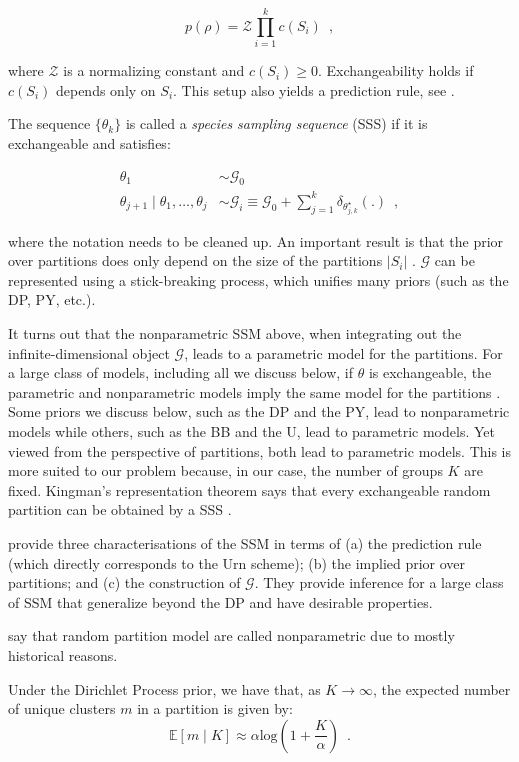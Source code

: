 \documentclass[]{article}
\begin{document}
\begin{equation}
    p(\rho) = \mathcal{Z} \prod_{i=1}^k c(S_i) \enspace ,
\end{equation}

where $\mathcal{Z}$ is a normalizing constant and $c(S_i) \geq 0$. Exchangeability holds if $c(S_i)$ depends only on $S_i$. This setup also yields a prediction rule, see \textcite[][Eq (7)]{quintana2006predictive}.

The sequence $\{\theta_k\}$ is called a \textit{species sampling sequence} (SSS) if it is exchangeable and satisfies:

\begin{align}
    \theta_1 &\sim \mathcal{G}_0 \\
    \theta_{j + 1} \mid \theta_1, \ldots, \theta_j  &\sim \mathcal{G}_i \equiv \mathcal{G}_0 + \sum_{j=1}^k \delta_{\theta^{\star}_{j, k}}(.) \enspace ,
\end{align}

where the notation needs to be cleaned up. An important result is that the prior over partitions does only depend on the size of the partitions $|S_i|$ \parencite{quintana2006predictive}. $\mathcal{G}$ can be represented using a stick-breaking process, which unifies many priors (such as the DP, PY, etc.).

It turns out that the nonparametric SSM above, when integrating out the infinite-dimensional object $\mathcal{G}$, leads to a parametric model for the partitions. For a large class of models, including all we discuss below, if $\theta$ is exchangeable, the parametric and nonparametric models imply the same model for the partitions \parencite{quintana2006predictive}. Some priors we discuss below, such as the DP and the PY, lead to nonparametric models while others, such as the BB and the U, lead to parametric models. Yet viewed from the perspective of partitions, both lead to parametric models. This is more suited to our problem because, in our case, the number of groups $K$ are fixed. Kingman's representation theorem says that every exchangeable random partition can be obtained by a SSS \parencite[e.g.,][]{lee2013defining}.

\textcite{lee2013defining} provide three characterisations of the SSM in terms of (a) the prediction rule (which directly corresponds to the Urn scheme); (b) the implied prior over partitions; and (c) the construction of $\mathcal{G}$. They provide inference for a large class of SSM that generalize beyond the DP and have desirable properties.

\textcite{muller2013bayesian} say that random partition model are called nonparametric due to mostly historical reasons.

Under the Dirichlet Process prior, we have that, as $K \rightarrow \infty$, the expected number of unique clusters $m$ in a partition is given by:
\begin{equation}
    \mathbb{E}[m \mid K] \approx \alpha \text{log}\left(1 + \frac{K}{\alpha}\right) \enspace .
\end{equation}

\printbibliography
\end{document}
